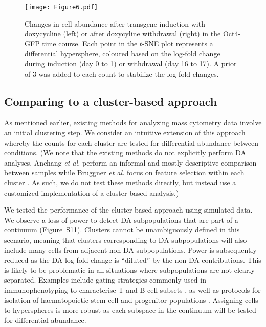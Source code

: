 \documentclass{article}
\newcommand{\suppfigclustersim}{S11}
\begin{document}
\begin{figure}[bt]
    \begin{center}
        \texttt{[image: Figure6.pdf]}
    \end{center}
    \caption{
        Changes in cell abundance after transgene induction with doxycycline (left) or after doxycyline withdrawal (right) in the Oct4-GFP time course.
        Each point in the $t$-SNE plot represents a differential hypersphere, coloured based on the log-fold change during induction (day 0 to 1) or withdrawal (day 16 to 17).
        A prior of 3 was added to each count to stabilize the log-fold changes.
    }
    \label{fig:importanttime}
\end{figure}

\subsection{Comparing to a cluster-based approach}
As mentioned earlier, existing methods for analyzing mass cytometry data involve an initial clustering step.
We consider an intuitive extension of this approach whereby the counts for each cluster are tested for differential abundance between conditions.
(We note that the existing methods do not explicitly perform DA analyses.
Anchang \textit{et al.} perform an informal and mostly descriptive comparison between samples \cite{anchang2016visualization} while Bruggner \textit{et al.} focus on feature selection within each cluster \cite{bruggner2014automated}.
As such, we do not test these methods directly, but instead use a customized implementation of a cluster-based analysis.)

We tested the performance of the cluster-based approach using simulated data.
We observe a loss of power to detect DA subpopulations that are part of a continuum (Figure~\suppfigclustersim{}).
Clusters cannot be unambiguously defined in this scenario, meaning that clusters corresponding to DA subpopulations will also include many cells from adjacent non-DA subpopulations.
Power is subsequently reduced as the DA log-fold change is ``diluted'' by the non-DA contributions.
This is likely to be problematic in all situations where subpopulations are not clearly separated.
Examples include gating strategies commonly used in immunophenotyping to characterise T and B cell subsets \cite{finak2016standardizing}, as well as protocols for isolation of haematopoietic stem cell and progenitor populations \cite{wilson2015combined}.
Assigning cells to hyperspheres is more robust as each subspace in the continuum will be tested for differential abundance.
\end{document}
